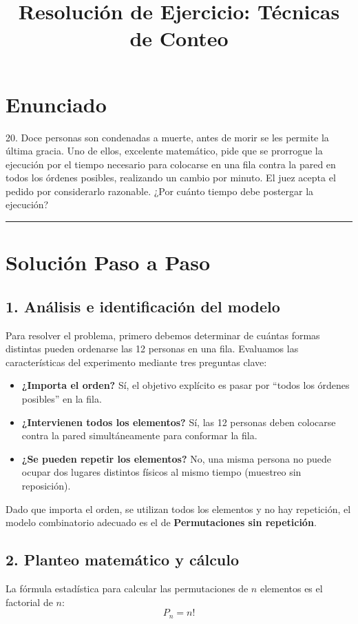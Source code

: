 \documentclass[12pt, a4paper]{article}
\title{Resolución de Ejercicio: Técnicas de Conteo}
\author{}
\date{}
\begin{document}
\maketitle

\section*{Enunciado}
20. Doce personas son condenadas a muerte, antes de morir se les permite la última gracia. Uno de ellos, excelente matemático, pide que se prorrogue la ejecución por el tiempo necesario para colocarse en una fila contra la pared en todos los órdenes posibles, realizando un cambio por minuto. El juez acepta el pedido por considerarlo razonable. ¿Por cuánto tiempo debe postergar la ejecución?

\vspace{0.5cm}
\hrule
\vspace{0.5cm}

\section*{Solución Paso a Paso}

\subsection*{1. Análisis e identificación del modelo}
Para resolver el problema, primero debemos determinar de cuántas formas distintas pueden ordenarse las 12 personas en una fila. Evaluamos las características del experimento mediante tres preguntas clave:
\begin{itemize}[label=\checkmark]
    \item \textbf{¿Importa el orden?} Sí, el objetivo explícito es pasar por ``todos los órdenes posibles'' en la fila.
    \item \textbf{¿Intervienen todos los elementos?} Sí, las 12 personas deben colocarse contra la pared simultáneamente para conformar la fila.
    \item \textbf{¿Se pueden repetir los elementos?} No, una misma persona no puede ocupar dos lugares distintos físicos al mismo tiempo (muestreo sin reposición).
\end{itemize}

Dado que importa el orden, se utilizan todos los elementos y no hay repetición, el modelo combinatorio adecuado es el de \textbf{Permutaciones sin repetición}.

\subsection*{2. Planteo matemático y cálculo}
La fórmula estadística para calcular las permutaciones de $n$ elementos es el factorial de $n$:
\[ P_n = n! \]
\end{document}
